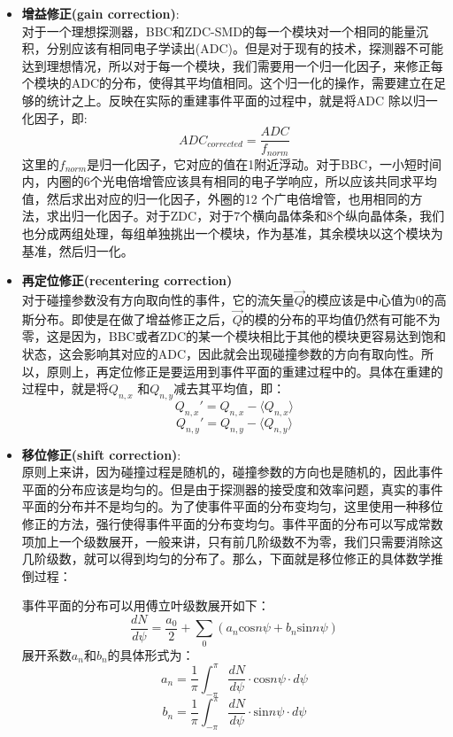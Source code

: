 \begin{itemize}
\item \textbf{增益修正(gain correction)}: \\
对于一个理想探测器，BBC和ZDC-SMD的每一个模块对一个相同的能量沉积，分别应该有相同电子学读出(ADC)。但是对于现有的技术，探测器不可能达到理想情况，所以对于每一个模块，我们需要用一个归一化因子，来修正每个模块的ADC的分布，使得其平均值相同。这个归一化的操作，需要建立在足够的统计之上。反映在实际的重建事件平面的过程中，就是将ADC 除以归一化因子，即:
\begin{equation}
ADC_{corrected} = \frac{ADC}{f_{norm}}
\end{equation}
这里的$f_{norm}$是归一化因子，它对应的值在1附近浮动。对于BBC，一小短时间内，内圈的6个光电倍增管应该具有相同的电子学响应，所以应该共同求平均值，然后求出对应的归一化因子，外圈的12 个广电倍增管，也用相同的方法，求出归一化因子。对于ZDC，对于7个横向晶体条和8个纵向晶体条，我们也分成两组处理，每组单独挑出一个模块，作为基准，其余模块以这个模块为基准，然后归一化。

\item \textbf{再定位修正(recentering correction)} \\
对于碰撞参数没有方向取向性的事件，它的流矢量$\vec{Q}$的模应该是中心值为0的高斯分布。即使是在做了增益修正之后，$\vec{Q}$的模的分布的平均值仍然有可能不为零，这是因为，BBC或者ZDC的某一个模块相比于其他的模块更容易达到饱和状态，这会影响其对应的ADC，因此就会出现碰撞参数的方向有取向性。所以，原则上，再定位修正是要运用到事件平面的重建过程中的。具体在重建的过程中，就是将$Q_{n,x}$ 和$Q_{n,y}$减去其平均值，即：
\begin{equation}
Q_{n,x}\prime = Q_{n,x} - \langle Q_{n,x} \rangle
\end{equation}
\begin{equation}
Q_{n,y}\prime = Q_{n,y} - \langle Q_{n,y} \rangle
\end{equation}

\item \textbf{移位修正(shift correction)}: \\
原则上来讲，因为碰撞过程是随机的，碰撞参数的方向也是随机的，因此事件平面的分布应该是均匀的。但是由于探测器的接受度和效率问题，真实的事件平面的分布并不是均匀的。为了使事件平面的分布变均匀，这里使用一种移位修正的方法，强行使得事件平面的分布变均匀。事件平面的分布可以写成常数项加上一个级数展开，一般来讲，只有前几阶级数不为零，我们只需要消除这几阶级数，就可以得到均匀的分布了。那么，下面就是移位修正的具体数学推倒过程：

事件平面的分布可以用傅立叶级数展开如下：
\begin{equation}
\frac{dN}{d\psi} = \frac{a_{0}}{2} + \sum_{0}(a_{n}\mathrm{cos}n\psi + b_{n}\mathrm{sin}n\psi)
\label{eq:dN_dPsi_1}
\end{equation}
展开系数$a_{n}$和$b_{n}$的具体形式为：
\begin{equation}
a_{n} = \frac{1}{\pi} \int^{\pi}_{-\pi} \frac{dN}{d\psi}\cdot \mathrm{cos}n\psi \cdot d\psi
\end{equation}
\begin{equation}
b_{n} = \frac{1}{\pi} \int^{\pi}_{-\pi} \frac{dN}{d\psi}\cdot \mathrm{sin}n\psi \cdot d\psi
\end{equation}


\end{itemize}
